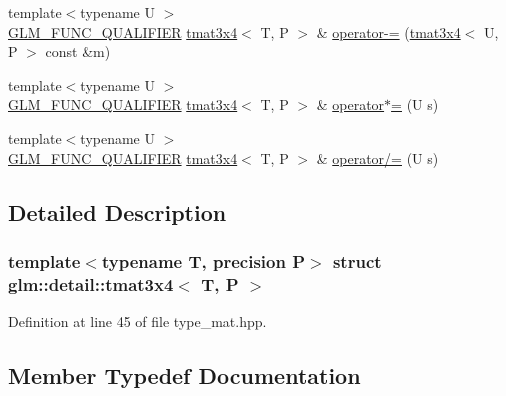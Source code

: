 \begin{DoxyCompactItemize}
\item 
{\footnotesize template$<$typename U $>$ }\\\hyperlink{setup_8hpp_a33fdea6f91c5f834105f7415e2a64407}{G\+L\+M\+\_\+\+F\+U\+N\+C\+\_\+\+Q\+U\+A\+L\+I\+F\+I\+ER} \hyperlink{structglm_1_1detail_1_1tmat3x4}{tmat3x4}$<$ T, P $>$ \& \hyperlink{structglm_1_1detail_1_1tmat3x4_ab293ffba697e138783137b5a0961afdf}{operator-\/=} (\hyperlink{structglm_1_1detail_1_1tmat3x4}{tmat3x4}$<$ U, P $>$ const \&m)
\item 
{\footnotesize template$<$typename U $>$ }\\\hyperlink{setup_8hpp_a33fdea6f91c5f834105f7415e2a64407}{G\+L\+M\+\_\+\+F\+U\+N\+C\+\_\+\+Q\+U\+A\+L\+I\+F\+I\+ER} \hyperlink{structglm_1_1detail_1_1tmat3x4}{tmat3x4}$<$ T, P $>$ \& \hyperlink{structglm_1_1detail_1_1tmat3x4_a329a90caa5d646b47ad7af4fdd657e95}{operator$\ast$=} (U s)
\item 
{\footnotesize template$<$typename U $>$ }\\\hyperlink{setup_8hpp_a33fdea6f91c5f834105f7415e2a64407}{G\+L\+M\+\_\+\+F\+U\+N\+C\+\_\+\+Q\+U\+A\+L\+I\+F\+I\+ER} \hyperlink{structglm_1_1detail_1_1tmat3x4}{tmat3x4}$<$ T, P $>$ \& \hyperlink{structglm_1_1detail_1_1tmat3x4_aa6519a6c5e446e309ad26f609fdb9a74}{operator/=} (U s)
\end{DoxyCompactItemize}


\subsection{Detailed Description}
\subsubsection*{template$<$typename T, precision P$>$\newline
struct glm\+::detail\+::tmat3x4$<$ T, P $>$}



Definition at line 45 of file type\+\_\+mat.\+hpp.



\subsection{Member Typedef Documentation}
\mbox{\label{structglm_1_1detail_1_1tmat3x4_aadea597c799e263c7580c0291753d0de}} 
